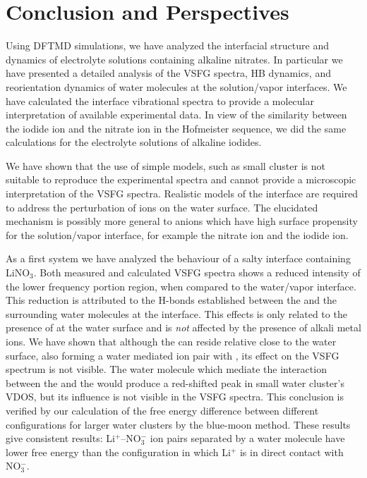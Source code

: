 \chapter{Conclusion and Perspectives}\label{CHAPTER_Summary}
Using DFTMD simulations, we have analyzed the interfacial structure and dynamics of electrolyte solutions containing alkaline nitrates.
In particular we have presented a detailed analysis of the VSFG spectra, HB dynamics, and reorientation dynamics of water molecules at the solution/vapor interfaces. 
We have calculated the interface vibrational spectra to provide a molecular interpretation of available experimental data. 
In view of the similarity between the iodide ion and the nitrate ion in the Hofmeister sequence, 
we did the same calculations for the electrolyte solutions of alkaline iodides. 

We have shown that the use of simple models, such as small cluster is not suitable to reproduce the experimental spectra 
and cannot provide a microscopic interpretation of the VSFG spectra. Realistic models of the interface are required to address the 
perturbation of ions on the water surface. The elucidated mechanism is possibly more general to anions which have high 
surface propensity for the solution/vapor interface, for example the nitrate ion and the iodide ion.

As a first system we have analyzed the behaviour of a salty interface containing LiNO$_3$.
Both measured and calculated VSFG spectra shows a reduced intensity of the lower frequency portion region, 
when compared to the water/vapor interface. 
This reduction is attributed to the H-bonds established between the \nitrate and the surrounding water molecules at the interface.
This effects is only related to the presence of \nitrate at the water surface and is \emph{not} affected by the presence of alkali metal ions.
We have shown that although the \Li can reside relative close to the water surface, also forming a water mediated
ion pair with \nit, its effect on the VSFG spectrum is not visible. The water molecule which mediate the interaction 
between the \nitrate and the \Li would produce a red-shifted peak in small water cluster's VDOS, but its influence is not visible 
in the VSFG spectra. This conclusion is verified by our calculation of the free energy difference between different configurations for 
larger water clusters by the blue-moon method. These results give consistent results: Li$^+$--NO$_3^-$ ion pairs 
separated by a water molecule have lower free energy than the configuration in which Li$^+$ is in direct contact with NO$_3^-$. 

